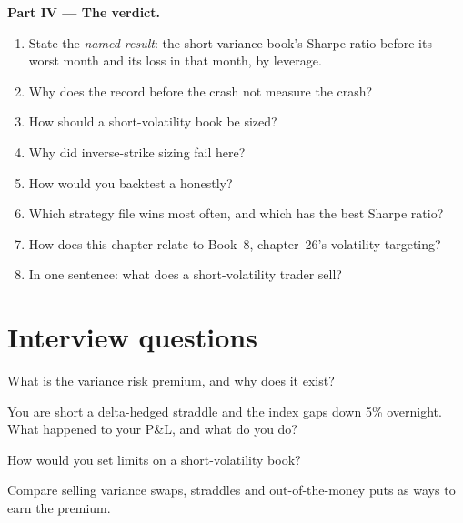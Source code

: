 \begin{problem}
\medskip\noindent\textbf{Part IV --- The verdict.}
\begin{enumerate}[resume]
\item State the \emph{named result}: the short-variance book's Sharpe ratio before its worst month and its loss in that month, by leverage.
\item Why does the record before the crash not measure the crash?
\item How should a short-volatility book be sized?
\item Why did inverse-strike sizing fail here?
\item How would you backtest a  honestly?
\item Which strategy file wins most often, and which has the best Sharpe ratio?
\item How does this chapter relate to Book~8, chapter~26's volatility targeting?
\item In one sentence: what does a short-volatility trader sell?
\end{enumerate}
\end{problem}

\section{Interview questions}

\begin{interviewq}\label{iq:s2:harvesting-the-variance-risk-premium:1}
What is the variance risk premium, and why does it exist?
\end{interviewq}

\begin{interviewq}\label{iq:s2:harvesting-the-variance-risk-premium:2}
You are short a delta-hedged straddle and the index gaps down 5\% overnight. What happened to your P\&L, and what do you do?
\end{interviewq}

\begin{interviewq}\label{iq:s2:harvesting-the-variance-risk-premium:3}
How would you set limits on a short-volatility book?
\end{interviewq}

\begin{interviewq}\label{iq:s2:harvesting-the-variance-risk-premium:4}
Compare selling variance swaps, straddles and out-of-the-money puts as ways to earn the premium.
\end{interviewq}

